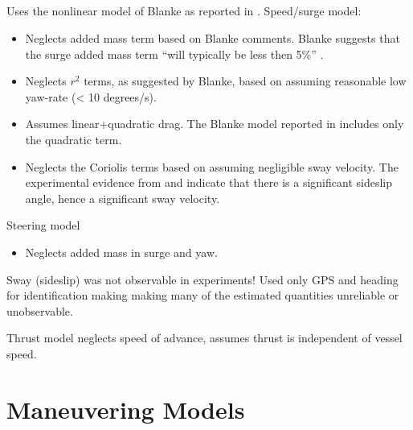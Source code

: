 \documentclass[11pt,draftcls,journal,onecolumn]{../latexlib/latex_ieee/IEEEtran}
\begin{document}
\subsection{\cite{caccia08practical}}
Uses the nonlinear model of Blanke \cite{blanke81ship} as reported in \cite{fossen94guidance}.  Speed/surge model:
\begin{itemize}
\item Neglects added mass term based on Blanke comments.  Blanke suggests that the surge added mass term ``will typically be less then 5\%'' \cite{fossen94guidance}.
\item Neglects $r^2$ terms, as suggested by Blanke, based on assuming reasonable low yaw-rate (< 10 degrees/s). 
\item Assumes linear+quadratic drag.  The Blanke model reported in \cite{fossen94guidance} includes only the quadratic term.  
\item Neglects the Coriolis terms based on assuming negligible sway velocity.  The experimental evidence from \cite{sonnenburg13modeling} and \cite{sonnenburg10control} indicate that there is a significant sideslip angle, hence a significant sway velocity.
\end{itemize}
Steering model
\begin{itemize}
\item Neglects added mass in surge and yaw.
\end{itemize}
Sway (sideslip) was not observable in experiments!  Used only GPS and heading for identification making making many of the estimated quantities unreliable or unobservable.

Thrust model neglects speed of advance, assumes thrust is independent of vessel speed.



\section{Maneuvering Models}
\end{document}
